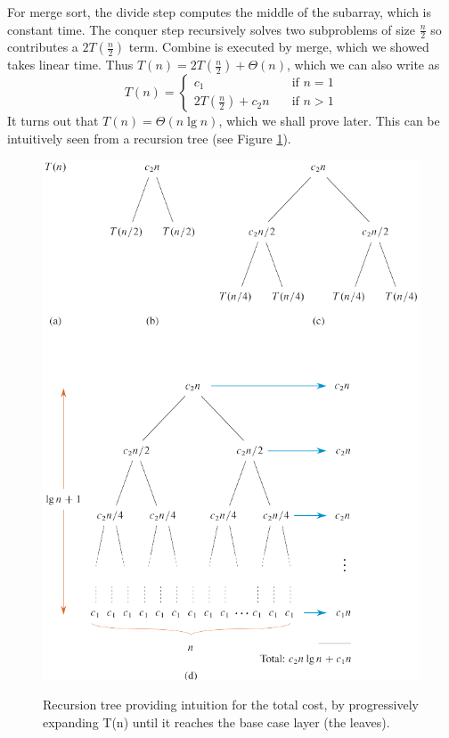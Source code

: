 \documentclass[12pt]{article}
\begin{document}
For merge sort, the divide step computes the middle of the subarray, which is constant time. The conquer step recursively
solves two subproblems of size $\frac{n}{2}$ so contributes a $2T(\frac{n}{2})$ term. Combine is executed by merge, which
we showed takes linear time. Thus $T(n) = 2T(\frac{n}{2}) + \Theta(n)$, which we can also write as
\[ T(n) =
  \begin{cases}
    c_1       & \quad \text{if } n = 1\\
    2T(\frac{n}{2}) + c_2n  & \quad \text{if } n > 1
  \end{cases}
\]
It turns out that $T(n) = \Theta(n\lg n)$, which we shall prove later. This can be intuitively seen from a recursion tree (see Figure \ref{Figure: recursion tree}).
\begin{figure}[ht]\centering\label{Figure: recursion tree}
    \includegraphics[angle=0]{Figures/recursion-tree.pdf}
    \caption{Recursion tree providing intuition for the total cost, by progressively expanding T(n) until
    it reaches the base case layer (the leaves).}
\end{figure}
\end{document}

